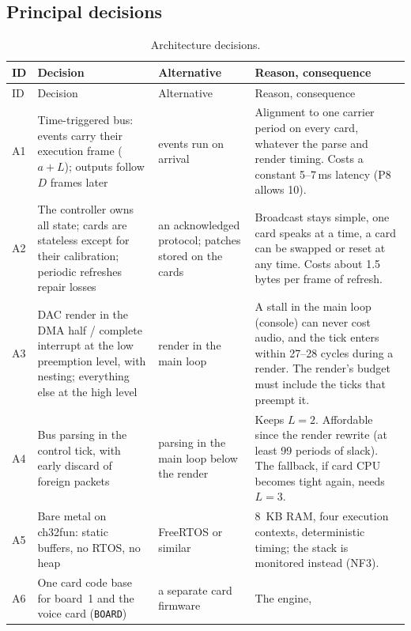 \subsection{Principal decisions}

\begingroup\small\setlength{\tabcolsep}{4pt}
\begin{longtable}{@{}>{\raggedright}p{0.7cm} >{\raggedright}p{4.4cm} >{\raggedright}p{3.6cm}
  >{\raggedright\arraybackslash}p{6.9cm}@{}}
\caption{Architecture decisions.}\label{tab:sadadr}\\
\toprule
ID & Decision & Alternative & Reason, consequence \\
\midrule\endfirsthead
\toprule
ID & Decision & Alternative & Reason, consequence \\
\midrule\endhead
\bottomrule\endfoot
A1 & Time-triggered bus: events carry their execution frame ($a + L$); outputs follow $D$ frames later & events run on
  arrival & Alignment to one carrier period on every card, whatever the parse and render timing. Costs a constant
  5--7\,ms latency (P8 allows 10). \\
A2 & The controller owns all state; cards are stateless except for their calibration; periodic refreshes repair
  losses & an acknowledged protocol; patches stored on the cards & Broadcast stays simple, one card speaks at a time,
  a card can be swapped or reset at any time. Costs about 1.5 bytes per frame of refresh. \\
A3 & DAC render in the DMA half / complete interrupt at the low preemption level, with nesting; everything else at
  the high level & render in the main loop & A stall in the main loop (console) can never cost audio, and the tick
  enters within 27--28 cycles during a render. The render's budget must include the ticks that preempt it. \\
A4 & Bus parsing in the control tick, with early discard of foreign packets & parsing in the main loop below the
  render & Keeps $L = 2$. Affordable since the render rewrite (at least 99 periods of slack). The fallback, if card CPU
  becomes tight again, needs $L = 3$. \\
A5 & Bare metal on ch32fun: static buffers, no RTOS, no heap & FreeRTOS or similar & \SI{8}{KB} RAM, four execution
  contexts, deterministic timing; the stack is monitored instead (NF3). \\
A6 & One card code base for board~1 and the voice card (\texttt{BOARD}) & a separate card firmware & The engine,

\end{longtable}
